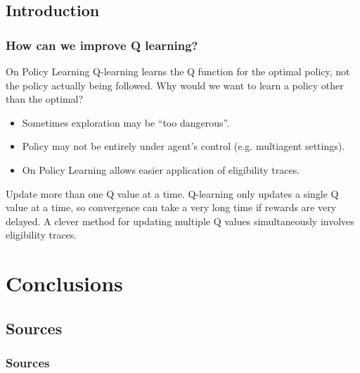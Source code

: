 \documentclass[ignorenonframetext]{beamer}
\begin{document}
\subsection{Introduction}
\begin{frame}[allowframebreaks]
	\frametitle{How can we improve Q learning?}
	\begin{block}{On Policy Learning}
		Q-learning learns the Q function for the optimal policy, not the
		policy actually being followed.  Why would we want to learn a
		policy other than the optimal?
		\begin{itemize}
			\item Sometimes exploration may be ``too dangerous''.
			\item Policy may not be entirely under agent's control (e.g.
				multiagent settings).
			\item On Policy Learning allows easier application of
				eligibility traces.
		\end{itemize}
	\end{block}
	\begin{block}{Update more than one Q value at a time.}
		Q-learning only updates a single Q value at a time, so convergence
		can take a very long time if rewards are very delayed.  A clever
		method for updating multiple Q values simultaneously involves
		eligibility traces.
	\end{block}
\end{frame}

\section{Conclusions}

\subsection{Sources}
\begin{frame}[allowframebreaks]
	\frametitle{Sources}
	\nocite{*}
	
	
\end{frame}
\end{document}
